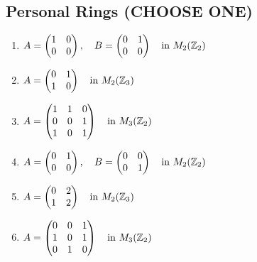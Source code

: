 \subsection{Personal Rings (CHOOSE ONE)}
\begin{enumerate}
    \setlength{\itemsep}{5pt} %
    \item[\#1)] $ A = \begin{pmatrix} 1 & 0 \\ 0 & 0 \end{pmatrix}, \quad 
                  B = \begin{pmatrix} 0 & 1 \\ 0 & 0 \end{pmatrix} 
                  \quad \text{in } M_2({\mathbb{Z}}_2) $
    
    \item[\#2)] $ A = \begin{pmatrix} 0 & 1 \\ 1 & 0 \end{pmatrix} 
                  \quad \text{in } M_2({\mathbb{Z}}_3) $
    
    \item[\#3)] $ A = \begin{pmatrix} 1 & 1 & 0 \\ 0 & 0 & 1 \\ 1 & 0 & 1 \end{pmatrix} 
                  \quad \text{in } M_3({\mathbb{Z}}_2) $
    
    \item[\#4)] $ A = \begin{pmatrix} 0 & 1 \\ 0 & 0 \end{pmatrix}, \quad 
                  B = \begin{pmatrix} 0 & 0 \\ 0 & 1 \end{pmatrix} 
                  \quad \text{in } M_2({\mathbb{Z}}_2) $
    
    \item[\#5)] $ A = \begin{pmatrix} 0 & 2 \\ 1 & 2 \end{pmatrix} 
                  \quad \text{in } M_2({\mathbb{Z}}_3) $
    
    \item[\#6)] $ A = \begin{pmatrix} 0 & 0 & 1 \\ 1 & 0 & 1 \\ 0 & 1 & 0 \end{pmatrix} 
                  \quad \text{in } M_3({\mathbb{Z}}_2) $
    

\end{enumerate}

